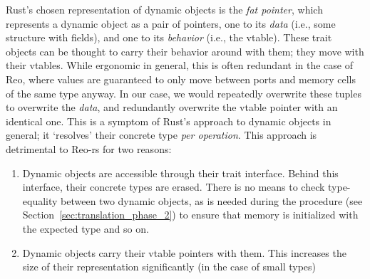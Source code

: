 Rust's chosen representation of dynamic objects is the \textit{fat pointer}, which represents a dynamic object as a pair of pointers, one to its \textit{data} (i.e., some structure with fields), and one to its \textit{behavior} (i.e., the vtable). These trait objects can be thought to carry their behavior around with them; they move with their vtables. While ergonomic in general, this is often redundant in the case of Reo, where values are guaranteed to only move between ports and memory cells of the same type anyway. In our case, we would repeatedly overwrite these tuples to overwrite the \textit{data}, and redundantly overwrite the vtable pointer with an identical one. This is a symptom of Rust's approach to dynamic objects in general; it `resolves' their concrete type \textit{per operation}. This approach is detrimental to Reo-rs for two reasons:
\begin{enumerate}
	\item Dynamic objects are accessible through their trait interface. Behind this interface, their concrete types are erased. There is no means to check type-equality between two dynamic  objects, as is needed during the  procedure (see Section~\ref{sec:translation_phase_2}) to ensure that memory is initialized with the expected type and so on.
	
	\item Dynamic objects carry their vtable pointers with them. This increases the size of their representation significantly (in the case of small types)
\end{enumerate}

